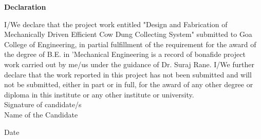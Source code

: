 \begin{center}
\begin{huge}
\bfseries{Declaration}\\
\end{huge}
\end{center}
\vspace{1cm}
I/We declare that the project work entitled "Design and Fabrication of Mechanically Driven Efficient Cow Dung Collecting System" submitted to Goa College of Engineering, in partial fulfillment of the requirement for the award of the degree of B.E. in 'Mechanical Engineering is a record of bonafide project work carried out by me/us under the guidance of Dr. Suraj Rane. I/We further declare that the work reported in this project has not been submitted and will not be submitted, either in part or in full, for the award of any other degree or diploma in this institute or any other institute or university.\\







\noindent Signature of candidate/s\\
\noindent Name of the Candidate








\noindent Date
